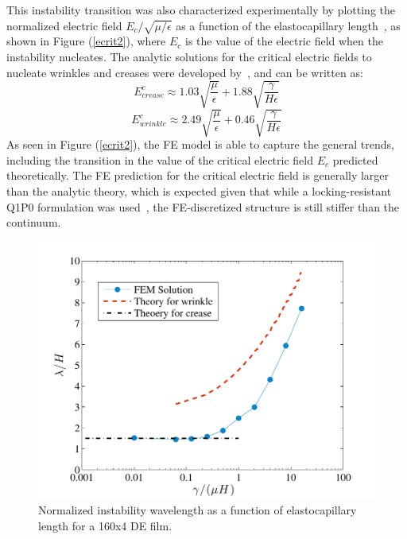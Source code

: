 \documentclass[8.5pt,twoside,twocolumn]{article}
\begin{document}
This instability transition was also characterized experimentally by plotting the normalized electric field $E_{c}/\sqrt{\mu/\epsilon}$  as a function of the elastocapillary length~\cite{wangPRE2013}, as shown in Figure (\ref{ecrit2}), where $E_{c}$ is the value of the electric field when the instability nucleates.  The analytic solutions for the critical electric fields to nucleate wrinkles and creases were developed by~\citet{wangPRE2013}, and can be written as:  
\begin{equation} \label{eqn:ECcrease}
E^{c}_{crease}\approx1.03\sqrt{\frac{\mu}{\epsilon}}+1.88\sqrt{\frac{\gamma}{H\epsilon}}
\end{equation}
\begin{equation} \label{eqn:ECwrinkle}
E^{c}_{wrinkle}\approx2.49\sqrt{\frac{\mu}{\epsilon}}+0.46\sqrt{\frac{\gamma}{H\epsilon}}
\end{equation}
As seen in Figure (\ref{ecrit2}), the FE model is able to capture the general trends, including the transition in the value of the critical electric field $E_{c}$ predicted theoretically.  The FE prediction for the critical electric field is generally larger than the analytic theory, which is expected given that while a locking-resistant Q1P0 formulation was used~\cite{simoCMAME1985}, the FE-discretized structure is still stiffer than the continuum.  

\begin{figure} \centering 
\includegraphics[scale=0.58]{pics/wave.pdf}
\caption{Normalized instability wavelength as a function of elastocapillary length for a 160x4 DE film.}
\label{ecrit1} \end{figure}
\end{document}
